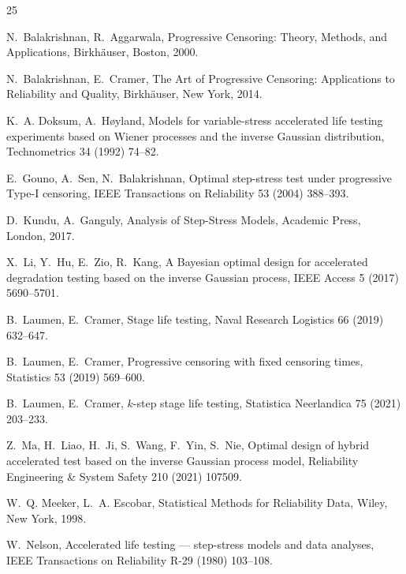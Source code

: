 \documentclass[11pt]{article}
\begin{document}
\begin{thebibliography}{25}

N.~Balakrishnan, R.~Aggarwala, Progressive Censoring: Theory, Methods, and Applications,
Birkh\"auser, Boston, 2000.

N.~Balakrishnan, E.~Cramer, The Art of Progressive Censoring: Applications to Reliability and
Quality, Birkh\"auser, New York, 2014.

K.~A. Doksum, A.~H{\o}yland, Models for variable-stress accelerated life testing experiments
based on Wiener processes and the inverse Gaussian distribution, Technometrics 34 (1992)
74--82.

E.~Gouno, A.~Sen, N.~Balakrishnan, Optimal step-stress test under progressive Type-I censoring,
IEEE Transactions on Reliability 53 (2004) 388--393.

D.~Kundu, A.~Ganguly, Analysis of Step-Stress Models, Academic Press, London, 2017.

X.~Li, Y.~Hu, E.~Zio, R.~Kang, A Bayesian optimal design for accelerated degradation testing
based on the inverse Gaussian process, IEEE Access 5 (2017) 5690--5701.

B.~Laumen, E.~Cramer, Stage life testing, Naval Research Logistics 66 (2019) 632--647.

B.~Laumen, E.~Cramer, Progressive censoring with fixed censoring times, Statistics 53 (2019)
569--600.

B.~Laumen, E.~Cramer, $k$-step stage life testing, Statistica Neerlandica 75 (2021) 203--233.

Z.~Ma, H.~Liao, H.~Ji, S.~Wang, F.~Yin, S.~Nie, Optimal design of hybrid accelerated test based
on the inverse Gaussian process model, Reliability Engineering \& System Safety 210 (2021)
107509.

W.~Q. Meeker, L.~A. Escobar, Statistical Methods for Reliability Data, Wiley, New York, 1998.

W.~Nelson, Accelerated life testing --- step-stress models and data analyses, IEEE Transactions
on Reliability R-29 (1980) 103--108.


\end{thebibliography}
\end{document}

